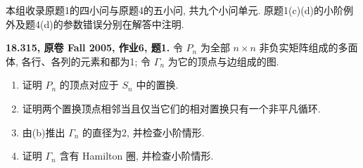 本组收录原题1的四小问与原题4的五小问, 共九个小问单元.
原题1(c)(d)的小阶例外及题4(d)的参数错误分别在解答中注明.

\begin{exercise}\label{mit:18315-hw6-q1}
\textbf{18.315, 原卷 Fall 2005, 作业6, 题1.}
令 $P_n$ 为全部 $n\times n$ 非负实矩阵组成的多面体,
各行、各列的元素和都为1; 令 $\Gamma_n$ 为它的顶点与边组成的图.
\begin{enumerate}[label=(\alph*)]
\item 证明 $P_n$ 的顶点对应于 $S_n$ 中的置换.
\item 证明两个置换顶点相邻当且仅当它们的相对置换只有一个非平凡循环.
\item 由(b)推出 $\Gamma_n$ 的直径为2, 并检查小阶情形.
\item 证明 $\Gamma_n$ 含有 Hamilton 圈, 并检查小阶情形.
\end{enumerate}
\end{exercise}

